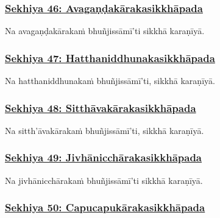 \subsubsection*{\hyperref[training46]{Sekhiya 46: Avagaṇḍakārakasikkhāpada}}
\label{sekh46}

Na avagaṇḍakārakaṁ bhuñjissāmī'ti sikkhā karaṇīyā.



\subsubsection*{\hyperref[training47]{Sekhiya 47: Hatthaniddhunakasikkhāpada}}
\label{sekh47}

Na hatthaniddhunakaṁ\makeatletter\hyperlink{endnote499-appendix}\makeatother{} bhuñjissāmī'ti, sikkhā karaṇīyā.



\subsubsection*{\hyperref[training48]{Sekhiya 48: Sitthāvakārakasikkhāpada}}
\label{sekh48}

Na sitth'āvakārakaṁ\makeatletter\hyperlink{endnote500-appendix}\makeatother{} bhuñjissāmī'ti, sikkhā karaṇīyā.



\subsubsection*{\hyperref[training49]{Sekhiya 49: Jivhānicchārakasikkhāpada}}
\label{sekh49}

Na jivhānicchārakaṁ bhuñjissāmī'ti sikkhā karaṇīyā.



\subsubsection*{\hyperref[training50]{Sekhiya 50: Capucapukārakasikkhāpada}}
\label{sekh50}

